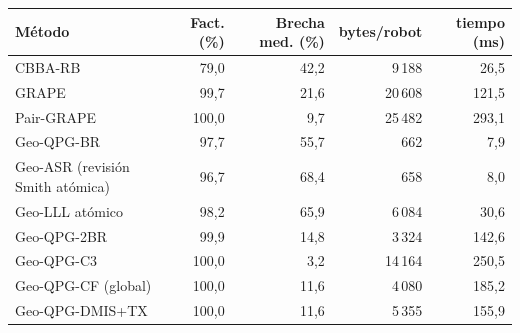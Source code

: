 \begin{tabular}{@{}lrrrr@{}}
\toprule
Método & Fact. (\%) & Brecha med. (\%) & bytes/robot & tiempo (ms) \\
\midrule
CBBA-RB & 79{,}0 & 42{,}2 & 9\,188 & 26{,}5 \\
GRAPE & 99{,}7 & 21{,}6 & 20\,608 & 121{,}5 \\
Pair-GRAPE & 100{,}0 & 9{,}7 & 25\,482 & 293{,}1 \\
Geo-QPG-BR & 97{,}7 & 55{,}7 & 662 & 7{,}9 \\
Geo-ASR (revisión Smith atómica) & 96{,}7 & 68{,}4 & 658 & 8{,}0 \\
Geo-LLL atómico & 98{,}2 & 65{,}9 & 6\,084 & 30{,}6 \\
Geo-QPG-2BR & 99{,}9 & 14{,}8 & 3\,324 & 142{,}6 \\
Geo-QPG-C3 & 100{,}0 & 3{,}2 & 14\,164 & 250{,}5 \\
Geo-QPG-CF (global) & 100{,}0 & 11{,}6 & 4\,080 & 185{,}2 \\
Geo-QPG-DMIS+TX & 100{,}0 & 11{,}6 & 5\,355 & 155{,}9 \\
\bottomrule
\end{tabular}
